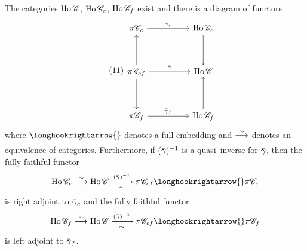 \documentclass[../main]{subfiles}
\begin{document}
\begin{theorem}\label{thm:1}
The categories $\operatorname{Ho} \mathscr{C}$, $\operatorname{Ho} \mathscr{C}_c$, $\operatorname{Ho} \mathscr{C}_f$ exist and there is a diagram of functors
\[\tag{11}\label{diag:1.1.11}
    \begin{tikzcd}
    \pi \cat C_c \arrow[rr, "\xoverline \gamma_c"]                        &  & \Ho \cat C_c \arrow[dd] \\
                                                                             &  &                             \\
    \pi \cat C_{cf} \arrow[uu] \arrow[dd] \arrow[rr, "\xoverline \gamma"] &  & \Ho \cat C              \\
                                                                             &  &                             \\
    \pi \cat C_f \arrow[rr, "\xoverline \gamma_f"]                        &  & \Ho \cat C_f \arrow[uu]
    \end{tikzcd}
\]
where $\longhookrightarrow{}$ denotes a full embedding and $\varrightarrow{\sim}$ denotes an equivalence of categories. Furthermore, if $(\xoverline \gamma)^{-1}$ is a quasi--inverse for $\xoverline \gamma$, then the fully faithful functor 
\[\Ho \cat C_c \varrightarrow{\sim} \Ho \cat C \varrightarrow[\sim]{(\xoverline \gamma)^{-1}} \pi \cat C_{cf} \longhookrightarrow{} \pi \cat C_c\] is right adjoint to $\xoverline \gamma_c$ and the fully faithful functor \[\Ho \cat C_f \varrightarrow{\sim} \Ho \cat C \varrightarrow[\sim]{(\xoverline \gamma)^{-1}} \pi \cat C_{cf} \longhookrightarrow{} \pi \cat C_f\] is left adjoint to $\xoverline \gamma_f$. 
\end{theorem} 
\end{document}
